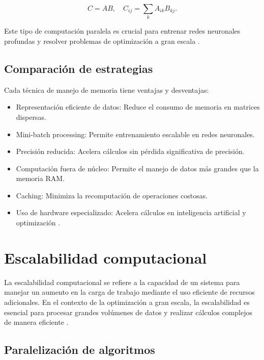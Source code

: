 \begin{itemize}
		\begin{equation}
			C = AB, \quad C_{ij} = \sum_{k} A_{ik} B_{kj}.
		\end{equation}
		
		Este tipo de computación paralela es crucial para entrenar redes neuronales profundas y resolver problemas de optimización a gran escala \cite{bottou2018optimization}.
		
		\subsection{Comparación de estrategias}
		
		Cada técnica de manejo de memoria tiene ventajas y desventajas:
		
		\begin{itemize}
			\item Representación eficiente de datos: Reduce el consumo de memoria en matrices dispersas.
			\item Mini-batch processing: Permite entrenamiento escalable en redes neuronales.
			\item Precisión reducida: Acelera cálculos sin pérdida significativa de precisión.
			\item Computación fuera de núcleo: Permite el manejo de datos más grandes que la memoria RAM.
			\item Caching: Minimiza la recomputación de operaciones costosas.
			\item Uso de hardware especializado: Acelera cálculos en inteligencia artificial y optimización \cite{goodfellow2016deep}.
		\end{itemize}
		\section{Escalabilidad computacional}
		
		La escalabilidad computacional se refiere a la capacidad de un sistema para manejar un aumento en la carga de trabajo mediante el uso eficiente de recursos adicionales. En el contexto de la optimización a gran escala, la escalabilidad es esencial para procesar grandes volúmenes de datos y realizar cálculos complejos de manera eficiente \cite{dean2008mapreduce}.
		
		\subsection{Paralelización de algoritmos}
		

\end{itemize}
